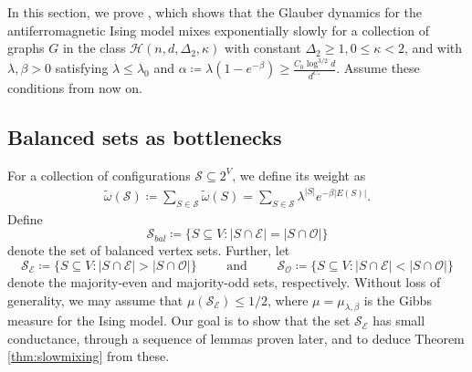 \documentclass[reqno,a4paper,11pt]{amsart}
\newcommand{\cE}{\mathcal{E}}
\newcommand{\cH}{\mathcal{H}}
\newcommand{\cO}{\mathcal{O}}
\newcommand{\cS}{\mathcal{S}}
\newcommand{\lam}{\lambda}
\newcommand{\om}{\omega}
\newcommand{\ex}{\kappa}
\newcommand{\exx}{C_*}
\newcommand{\codeg}{\Delta_2}
\begin{document}
In this section, we prove , which shows that the Glauber dynamics for the antiferromagnetic Ising model mixes exponentially slowly for a collection of graphs $G$ in the class $\cH(n, d, \codeg, \ex)$ with constant $\codeg \geq 1, 0 \leq \ex <2$, and with $\lambda, \beta > 0$ satisfying $\lam \le \lam_0$ and $\alpha \coloneqq \lam (1 - e^{-\beta}) \ge \frac{C_0 \log^{3/2}d}{d^{\exx}}$. Assume these conditions from now on.

\subsection{Balanced sets as bottlenecks}
For a collection of configurations $\mathcal{S} \subseteq 2^V$, we define its weight as
\begin{align*}
    \tilde{\omega}(\mathcal{S}) \coloneqq \sum_{S \in \cS} \tilde{\om}(S) = \sum_{S \in \cS} \lambda^{|S|} e^{- \beta |E(S)|}.
\end{align*}
Define
\[\cS_{bal} \coloneqq \{S \subseteq V : |S \cap \cE|=|S \cap \cO|\}
\]
denote the set of balanced vertex sets.
Further, let 
\[
\cS_{\cE} \coloneqq \{S \subseteq V : |S \cap \cE|>|S \cap \cO|\} \qquad \text{ and } \qquad \cS_{\cO} \coloneqq \{S \subseteq V : |S \cap \cE|<|S \cap \cO|\}
\]
denote the majority-even and majority-odd sets, respectively. Without loss of generality, we may assume that $\mu(\cS_{\cE}) \leq 1/2$, where $\mu=\mu_{\lambda, \beta}$ is the Gibbs measure for the Ising model. Our goal is to show that the set $\cS_{\cE}$ has small conductance, through a sequence of lemmas proven later, and to deduce Theorem \ref{thm:slowmixing} from these.
\end{document}
